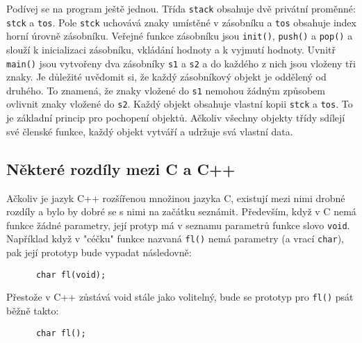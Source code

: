 {\begin{example}
        Podívej se na program ještě jednou. Třída \lstinline[basicstyle=\ttfamily]!stack! obsahuje 
        dvě privátní proměnné: \lstinline[basicstyle=\ttfamily]!stck! a 
        \lstinline[basicstyle=\ttfamily]!tos!. Pole 
        \lstinline[basicstyle=\ttfamily]!stck! uchovává znaky umístěné v zásobníku a 
        \lstinline[basicstyle=\ttfamily]!tos! obsahuje index horní úrovně zásobníku. Veřejné funkce 
        zásobníku jsou \lstinline[basicstyle=\ttfamily]!init()!, 
        \lstinline[basicstyle=\ttfamily]!push()! a
        \lstinline[basicstyle=\ttfamily]!pop()! a slouží k inicializaci zásobníku, vkládání hodnoty 
        a k vyjmutí hodnoty. Uvnitř \lstinline[basicstyle=\ttfamily]!main()! jsou vytvořeny dva 
        zásobníky \lstinline[basicstyle=\ttfamily]!s1! a \lstinline[basicstyle=\ttfamily]!s2! a do 
        každého z nich jsou vloženy tři znaky. Je důležité uvědomit si, že každý zásobníkový objekt 
        je oddělený od druhého. To znamená, že znaky vložené do         
        \lstinline[basicstyle=\ttfamily]!s1! nemohou žádným způsobem ovlivnit znaky vložené do 
        \lstinline[basicstyle=\ttfamily]!s2!. Každý objekt obsahuje vlastní kopii 
        \lstinline[basicstyle=\ttfamily]!stck! a \lstinline[basicstyle=\ttfamily]!tos!. To je 
        základní princip pro pochopení objektů. Ačkoliv všechny objekty třídy sdílejí své členské 
        funkce, každý objekt vytváří a udržuje svá vlastní 
        data.
      \end{example}	
  
    \subsection{Některé rozdíly mezi C a C++}
      Ačkoliv je jazyk C++ rozšířenou množinou jazyka C, existují mezi nimi drobné rozdíly a bylo 
      by dobré se s nimi na začátku seznámit. Především, když v C nemá funkce žádné parametry, její 
      protyp má v seznamu parametrů funkce slovo \lstinline[basicstyle=\ttfamily]!void!. Například 
      když v "céčku" funkce nazvaná \lstinline[basicstyle=\ttfamily]!fl()! nemá parametry (a vrací 
      \lstinline[basicstyle=\ttfamily]!char!), pak její prototyp bude vypadat následovně:
      \begin{lstlisting}
      char fl(void);
      \end{lstlisting}
      Přestože v C++ zůstává void stále jako volitelný, bude se prototyp pro 
      \lstinline[basicstyle=\ttfamily]!fl()! psát běžně takto:
      \begin{lstlisting}
      char fl();
      \end{lstlisting}
  
}
